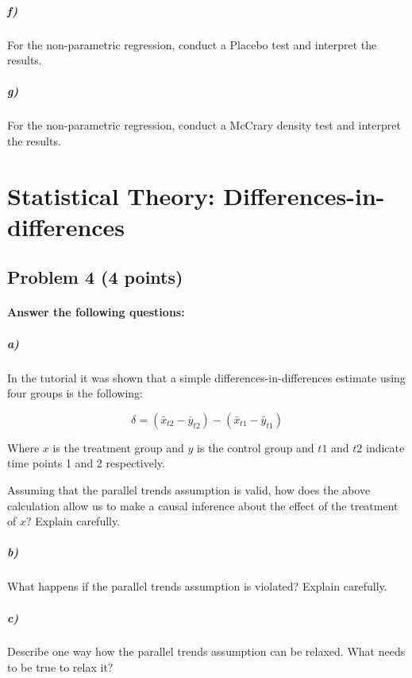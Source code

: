 \documentclass[12pt]{article}
\begin{document}
\subparagraph{f)} For the non-parametric regression, conduct a Placebo test and interpret the results.

\subparagraph{g)} For the non-parametric regression, conduct a McCrary density test and interpret the results.




\section*{Statistical Theory: Differences-in-differences}

\subsection*{Problem 4 (4 points)}

\paragraph{Answer the following questions:}

\subparagraph*{a)} In the tutorial it was shown that a simple differences-in-differences estimate using four groups is the following:

$$ \delta = (\bar{x} _{t2} - \bar{y} _{t2}) - (\bar{x} _{t1} - \bar{y} _{t1}) $$

Where $x$ is the treatment group and $y$ is the control group and $t1$ and $t2$ indicate time points 1 and 2 respectively.

Assuming that the parallel trends assumption is valid, how does the above calculation allow us to make a causal inference about the effect of the treatment of $x$? Explain carefully.

\subparagraph*{b)} What happens if the parallel trends assumption is violated? Explain carefully.

\subparagraph*{c)} Describe one way how the parallel trends assumption can be relaxed. What needs to be true to relax it?
\end{document}
